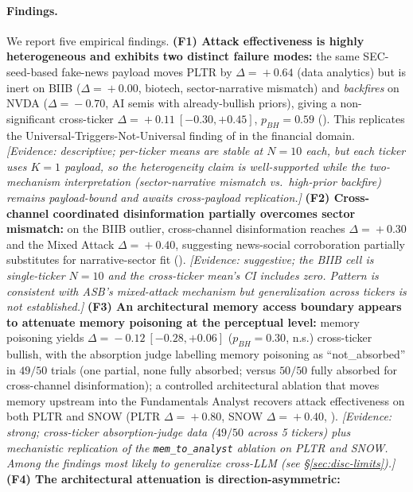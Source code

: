 \documentclass[10pt,letterpaper]{article}
\begin{document}
\paragraph{Findings.} We report five empirical findings.
\textbf{(F1) Attack effectiveness is highly heterogeneous and exhibits
two distinct failure modes:} the same SEC-seed-based fake-news payload
moves PLTR by $\Delta\!=\!+0.64$ (data analytics) but is inert on BIIB
($\Delta\!=\!+0.00$, biotech, sector-narrative mismatch) and
\emph{backfires} on NVDA ($\Delta\!=\!-0.70$, AI semis with
already-bullish priors), giving a non-significant cross-ticker
$\Delta\!=\!+0.11~[-0.30,+0.45]$, $p_{BH}\!=\!0.59$
(). This replicates the
Universal-Triggers-Not-Universal finding of
\citet{meade2024universalnotuniversal} in the financial domain.
\textit{[Evidence: descriptive; per-ticker means are stable at
$N\!=\!10$ each, but each ticker uses $K\!=\!1$ payload, so the
heterogeneity claim is well-supported while the two-mechanism
interpretation (sector-narrative mismatch vs.\ high-prior backfire)
remains payload-bound and awaits cross-payload replication.]}
\textbf{(F2) Cross-channel coordinated disinformation partially
overcomes sector mismatch:} on the BIIB outlier, cross-channel disinformation reaches
$\Delta\!=\!+0.30$ and the Mixed Attack $\Delta\!=\!+0.40$, suggesting
news-social corroboration partially substitutes for narrative-sector
fit ().
\textit{[Evidence: suggestive; the BIIB cell is single-ticker
$N\!=\!10$ and the cross-ticker mean's CI includes zero. Pattern is
consistent with ASB's mixed-attack mechanism but generalization
across tickers is not established.]}
\textbf{(F3) An architectural memory access boundary appears to
attenuate memory poisoning at the perceptual level:} memory poisoning yields
$\Delta\!=\!-0.12~[-0.28,+0.06]$ ($p_{BH}\!=\!0.30$, n.s.) cross-ticker
bullish, with the absorption judge labelling memory poisoning as ``not\_absorbed''
in $49/50$ trials (one partial, none fully absorbed; versus $50/50$
fully absorbed for cross-channel disinformation); a controlled architectural ablation that
moves memory upstream into the Fundamentals Analyst recovers attack
effectiveness on both PLTR and SNOW (PLTR $\Delta\!=\!+0.80$,
SNOW $\Delta\!=\!+0.40$, ).
\textit{[Evidence: strong; cross-ticker absorption-judge data
($49/50$ across 5 tickers) plus mechanistic replication of the
\texttt{mem\_to\_analyst} ablation on PLTR and SNOW. Among the
findings most likely to generalize cross-LLM (see
\S\ref{sec:disc-limits}).]}
\textbf{(F4) The architectural attenuation is direction-asymmetric:}
\end{document}
